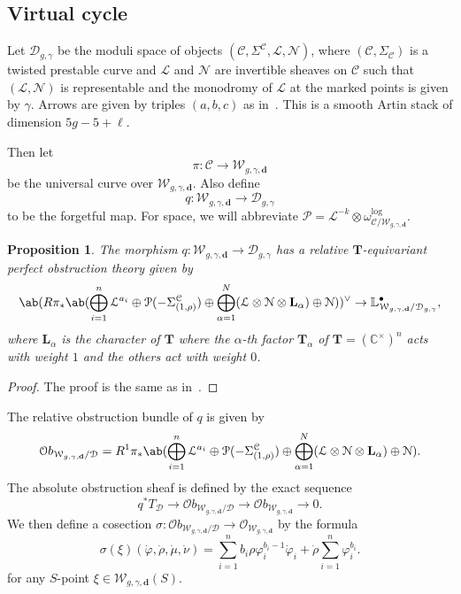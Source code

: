 \documentclass{amsart}
\newtheorem{prop}[thm]{Proposition}
\theoremstyle{definition}
\theoremstyle{remark}
\theoremstyle{plain}
\theoremstyle{definition}
\theoremstyle{remark}
\newcommand{\C}{\mathbb{C}}
\newcommand{\T}{\mathbf{T}}
\renewcommand{\L}{\mathbb{L}}
\newcommand{\mc}[1]{\mathcal{#1}}
\newcommand{\mbf}[1]{\mathbf{#1}}
\newcommand{\1}{\mathbf{1}}
\newcommand{\2}{\mathbf{2}}
\newcommand{\3}{\mathbf{3}}
\begin{document}
\subsection{Virtual cycle}
\label{subsec:virtual_cycle}

Let $\mc{D}_{g,\gamma}$ be the moduli space of objects $(\mc{C}, \Sigma^{\mc{C}}, \mc{L}, \mc{N})$, where $(\mc{C}, \Sigma_{\mc{C}})$ is a twisted prestable curve and $\mc{L}$ and $\mc{N}$ are invertible sheaves on $\mc{C}$ such that $(\mc{L}, \mc{N})$ is representable and the monodromy of $\mc{L}$ at the marked points is given by $\gamma$. Arrows are given by triples $(a,b,c)$ as in~. This is a smooth Artin stack of dimension $5g-5+\ell$.

Then let 
\begin{equation}
\pi \colon \mc{C} \to \mc{W}_{g,\gamma,\mbf{d}} 
\end{equation}
be the universal curve over $\mc{W}_{g,\gamma,\mbf{d}}$. Also define 
\begin{equation}
q \colon \mc{W}_{g,\gamma,\mbf{d}} \to \mc{D}_{g,\gamma} 
\end{equation}
to be the forgetful map. For space, we will abbreviate $\mc{P} = \mc{L}^{-k} \otimes \omega_{\mc{C}/\mc{W}_{g,\gamma,\mbf{d}}}^{\log}$.

\begin{prop}
The morphism $q \colon \mc{W}_{g,\gamma,\mbf{d}} \to \mc{D}_{g,\gamma}$ has a relative $\T$-equivariant perfect obstruction theory given by
\begin{equation}
  \ab(R \pi_* \ab(\bigoplus_{i=1}^n \mc{L}^{a_i} \oplus \mc{P}(-\Sigma^{\mc{C}}_{(1,\rho)}) \oplus \bigoplus_{\alpha=1}^N (\mc{L} \otimes \mc{N} \otimes \mbf{L}_{\alpha}) \oplus \mc{N}))^{\vee} \to \L^{\bullet}_{\mc{W}_{g,\gamma,\mbf{d}}/\mc{D}_{g,\gamma}},
\end{equation}
where $\mbf{L}_{\alpha}$ is the character of $\T$ where the $\alpha$-th factor $\T_{\alpha}$ of $\T = (\C^{\times})^n$ acts with weight $1$ and the others act with weight $0$. 
\end{prop}

\begin{proof}
  The proof is the same as in~\cite{mspfermat}.
\end{proof}

The relative obstruction bundle of $q$ is given by
\[ \mc{O}b_{\mc{W}_{g,\gamma,\mbf{d}}/\mc{D}} = R^1 \pi_* \ab(\bigoplus_{i=1}^n \mc{L}^{a_i} \oplus \mc{P}(-\Sigma^{\mc{C}}_{(1,\rho)}) \oplus \bigoplus_{\alpha=1}^N (\mc{L} \otimes \mc{N} \otimes \mbf{L}_{\alpha}) \oplus \mc{N}). \]
The absolute obstruction sheaf is defined by the exact sequence
\[ q^* T_{\mc{D}} \to \mc{O}b_{\mc{W}_{g,\gamma, \mbf{d}}/\mc{D}} \to \mc{O}b_{\mc{W}_{g,\gamma, \mbf{d}}} \to 0. \]
We then define a cosection $\sigma \colon \mc{O}b_{\mc{W}_{g,\gamma,\mbf{d}}/\mc{D}} \to \mc{O}_{\mc{W}_{g,\gamma,\mbf{d}}}$ by the formula
\begin{equation}\label{eqn:cosection}
\sigma(\xi)(\dot{\varphi}, \dot{\rho}, \dot{\mu}, \dot{\nu}) = \sum_{i=1}^n b_i \rho \varphi_i^{b_i - 1} \dot{\varphi}_i + \dot{\rho} \sum_{i=1}^n \varphi_i^{b_i}.
\end{equation}
for any $S$-point $\xi \in \mc{W}_{g,\gamma,\mbf{d}}(S)$.
\end{document}
